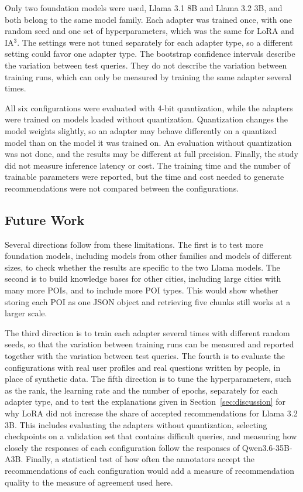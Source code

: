 \documentclass[journal,article,submit,pdftex,moreauthors]{Definitions/mdpi}
\begin{document}
Only two foundation models were used, Llama 3.1 8B and Llama 3.2 3B, and both belong to the same model family. Each adapter was trained once, with one random seed and one set of hyperparameters, which was the same for LoRA and IA$^3$. The settings were not tuned separately for each adapter type, so a different setting could favor one adapter type. The bootstrap confidence intervals describe the variation between test queries. They do not describe the variation between training runs, which can only be measured by training the same adapter several times.

All six configurations were evaluated with 4-bit quantization, while the adapters were trained on models loaded without quantization. Quantization changes the model weights slightly, so an adapter may behave differently on a quantized model than on the model it was trained on. An evaluation without quantization was not done, and the results may be different at full precision. Finally, the study did not measure inference latency or cost. The training time and the number of trainable parameters were reported, but the time and cost needed to generate recommendations were not compared between the configurations.

\subsection{Future Work}
Several directions follow from these limitations. The first is to test more foundation models, including models from other families and models of different sizes, to check whether the results are specific to the two Llama models. The second is to build knowledge bases for other cities, including large cities with many more POIs, and to include more POI types. This would show whether storing each POI as one JSON object and retrieving five chunks still works at a larger scale.

The third direction is to train each adapter several times with different random seeds, so that the variation between training runs can be measured and reported together with the variation between test queries. The fourth is to evaluate the configurations with real user profiles and real questions written by people, in place of synthetic data. The fifth direction is to tune the hyperparameters, such as the rank, the learning rate and the number of epochs, separately for each adapter type, and to test the explanations given in Section~\ref{sec:discussion} for why LoRA did not increase the share of accepted recommendations for Llama 3.2 3B. This includes evaluating the adapters without quantization, selecting checkpoints on a validation set that contains difficult queries, and measuring how closely the responses of each configuration follow the responses of Qwen3.6-35B-A3B. Finally, a statistical test of how often the annotators accept the recommendations of each configuration would add a measure of recommendation quality to the measure of agreement used here.
\end{document}
